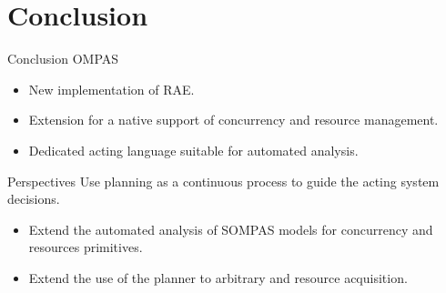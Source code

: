 \section{Conclusion}
\begin{frame}[c]{Conclusion}
    OMPAS
    \begin{itemize}
        \item New implementation of RAE.
        \item Extension for a native support of concurrency and resource management.
        \item Dedicated acting language suitable for automated analysis.
    \end{itemize}    
\end{frame}

\begin{frame}[c]{Perspectives}
    Use planning as a continuous process to guide the acting system decisions.
    \begin{itemize}
    \item Extend the automated analysis of SOMPAS models \cite{turiGuidanceRefinementbasedActing2022} for concurrency and resources primitives.
    \item Extend the use of the planner to arbitrary and resource acquisition.
    \end{itemize}
\end{frame}

